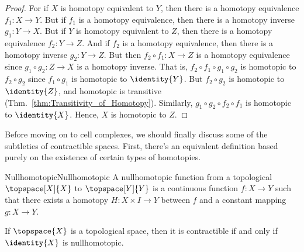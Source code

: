         \begin{proof}
            For if $X$ is homotopy equivalent to $Y$, then there is a
            homotopy equivalence $f_{1}:X\rightarrow{Y}$. But if $f_{1}$
            is a homotopy equivalence, then there is a homotopy inverse
            $g_{1}:Y\rightarrow{X}$. But if $Y$ is homotopy equivalent
            to $Z$, then there is a homotopy equivalence
            $f_{2}:Y\rightarrow{Z}$. And if $f_{2}$ is a homotopy
            equivalence, then there is a homotopy inverse
            $g_{2}:Y\rightarrow{Z}$. But then
            $f_{2}\circ{f}_{1}:X\rightarrow{Z}$ is a homotopy
            equivalence since $g_{1}\circ{g}_{2}:Z\rightarrow{X}$ is a
            homotopy inverse. That is,
            $f_{2}\circ{f}_{1}\circ{g}_{1}\circ{g}_{2}$ is homotopic to
            $f_{2}\circ{g}_{2}$ since $f_{1}\circ{g}_{1}$ is homotopic
            to $\identity{Y}$. But $f_{2}\circ{g}_{2}$ is homotopic to
            $\identity{Z}$, and homotopic is transitive
            (Thm.~\ref{thm:Transitivity_of_Homotopy}). Similarly,
            $g_{1}\circ{g}_{2}\circ{f}_{2}\circ{f}_{1}$ is homotopic to
            $\identity{X}$. Hence, $X$ is homotopic to $Z$.
        \end{proof}
        Before moving on to cell complexes, we should finally discuss
        some of the subtleties of contractible spaces. First, there's an
        equivalent definition based purely on the existence of certain
        types of homotopies.
        \begin{fdefinition}{Nullhomotopic}{Nullhomotopic}
            A nullhomotopic function from a topological
            $\topspace[X]{X}$ to $\topspace[Y]{Y}$ is a continuous
            function $f:X\rightarrow{Y}$ such that there exists a
            homotopy $H:X\times{I}\rightarrow{Y}$ between $f$ and a
            constant mapping $g:X\rightarrow{Y}$.
        \end{fdefinition}
        \begin{theorem}
            If $\topspace{X}$ is a topological space, then it is
            contractible if and only if $\identity{X}$ is nullhomotopic.
        \end{theorem}
